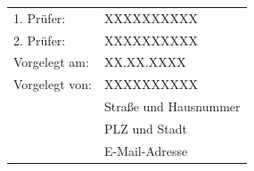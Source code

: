 \begin{titlepage}
\begin{center}
      \vspace*{4cm}

      \begin{tabular}{ l l }
          1. Prüfer: & XXXXXXXXXX\\
          2. Prüfer: & XXXXXXXXXX \\
          Vorgelegt am: & XX.XX.XXXX \\
          Vorgelegt von: & XXXXXXXXXX \\
          & Straße und Hausnummer \\
          & PLZ und Stadt \\
          & E-Mail-Adresse \\
      \end{tabular}

  \end{center}
  
\end{titlepage}